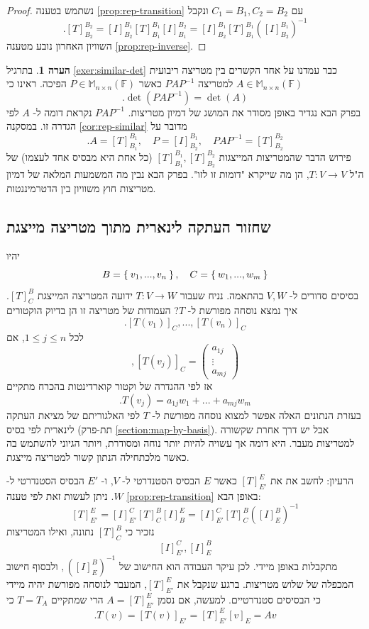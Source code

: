 \documentclass[12pt]{report}
\theoremstyle{plain}
\theoremstyle{definition}
\newtheorem{remark}{הערה}[chapter]
\newcommand{\F}{\mathbb{F}}
\newcommand{\M}{\mathbb{M}}
\newcommand{\0}{\mathbf{0}}
\begin{document}
\begin{proof}
נשתמש בטענה
\ref{prop:rep-transition}
עם
$C_1=B_1,C_2=B_2$
ונקבל
$$
.[T]_{B_2}^{B_2}=[I]_{B_2}^{B_1}[T]_{B_1}^{B_1}[I]_{B_1}^{B_2}=[I]_{B_2}^{B_1}[T]_{B_1}^{B_1}([I]_{B_2}^{B_1})^{-1}
$$
השוויון האחרון נובע מטענה
\ref{prop:rep-inverse}.

\end{proof}

\begin{remark}
בתרגיל 
\ref{exer:similar-det}
כבר עמדנו על אחד הקשרים בין מטריצה ריבועית
$A\in\M_{n\times n}(\F)$
למטריצה
$PAP^{-1}$
כאשר 
$P\in\M_{n\times n}(\F)$
הפיכה. ראינו כי
$$
.\det(PAP^{-1})=\det(A)
$$
בפרק הבא נגדיר באופן מסודר את המושג של דמיון מטריצות. 
$PAP^{-1}$
נקראת דומה ל-
$A$
לפי הגדרה זו. במסקנה 
\ref{cor:rep-similar}
מדובר על
$$
.A=[T]_{B_1}^{B_1},\quad P=[I]_{B_2}^{B_1},\quad PAP^{-1}=[T]_{B_2}^{B_2}
$$
פירוש הדבר שהמטריצות המייצגות
$[T]_{B_1}^{B_1},[T]_{B_2}^{B_2}$
(כל אחת היא מבסיס אחד לעצמו)
של ה"ל
$T:V\to V$,
הן מה שייקרא "דומות זו לזו". בפרק הבא נבין מה המשמעות המלאה של דמיון מטריצות חוץ משוויון בין הדטרמיננטות.
\end{remark}

\subsection{שחזור העתקה לינארית מתוך מטריצה מייצגת}
יהיו
$$
B=\Set{v_1,...,v_n},\quad C=\Set{w_1,...,w_m}
$$
בסיסים סדורים ל-
$V,W$
בהתאמה.
נניח שעבור
$T:V\to W$
ידועה המטריצה המייצגת
$[T]_C^B$.
איך נמצא נוסחה מפורשת ל-
$T$?
העמודות של מטריצה זו הן בדיוק הוקטורים
$$
.[T(v_1)]_C,...,[T(v_n)]_C
$$
לכל
$1\leq j\leq n$,
אם
$$
,[T(v_j)]_C=\begin{pmatrix}a_{1j}\\ \vdots \\ a_{mj}\end{pmatrix}
$$
אז לפי ההגדרה של וקטור קוארדינטות בהכרח מתקיים
$$
.T(v_j)=a_{1j}w_1+...+a_{mj}w_m
$$
בעזרת הנתונים האלה אפשר למצוא נוסחה מפורשת ל-
$T$
לפי האלגוריתם של מציאת העתקה לינארית לפי בסיס
(תת-פרק
\ref{section:map-by-basis}).
אבל יש דרך אחרת שקשורה למטריצות מעבר. היא דומה אך עשויה להיות יותר נוחה ומסודרת, ויותר הגיוני להשתמש בה כאשר מלכתחילה הנתון קשור למטריצה מייצגת.

הרעיון: לחשב את את
$[T]_{E'}^E$
כאשר
$E$
הבסיס הסטנדרטי ל-
$V$,
ו-
$E'$
הבסיס הסטנדרטי ל-
$W$.
ניתן לעשות זאת לפי טענה
\ref{prop:rep-transition}
באופן הבא:
$$
[T]_{E'}^E=[I]_{E'}^C[T]_C^B[I]_B^E=[I]_{E'}^C[T]_C^B([I]_E^B)^{-1}
$$
נזכיר כי
$[T]_C^B$
נתונה, ואילו המטריצות
$$
[I]_{E'}^C, [I]_E^B
$$
מתקבלות באופן מיידי. לכן עיקר העבודה הוא החישוב של
$
,([I]_E^B)^{-1}
$
ולבסוף חישוב המכפלה של שלוש מטריצות. ברגע שנקבל את
$[T]_{E'}^E$,
המעבר לנוסחה מפורשת יהיה מיידי כי הבסיסים סטנדרטיים. למעשה, אם נסמן 
$A=[T]_{E'}^E$
הרי שמתקיים
$T=T_A$
כי
$$
.T(v)=[T(v)]_{E'}=[T]_{E'}^E[v]_E=Av
$$
\end{document}
